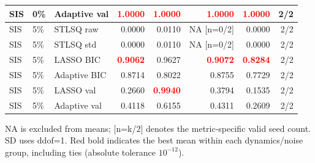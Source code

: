 \documentclass{article}
\begin{document}
\begin{longtable}{lllrrrrr}
SIS & 0\% & Adaptive val & \textcolor{red}{\textbf{1.0000}} & \textcolor{red}{\textbf{1.0000}} & \textcolor{red}{\textbf{1.0000}} & \textcolor{red}{\textbf{1.0000}} & 2/2 \\
\midrule
SIS & 5\% & STLSQ raw & 0.0000 & 0.0110 & NA [n=0/2] & 0.0000 & 2/2 \\
SIS & 5\% & STLSQ std & 0.0000 & 0.0110 & NA [n=0/2] & 0.0000 & 2/2 \\
SIS & 5\% & LASSO BIC & \textcolor{red}{\textbf{0.9062}} & 0.9627 & \textcolor{red}{\textbf{0.9072}} & \textcolor{red}{\textbf{0.8284}} & 2/2 \\
SIS & 5\% & Adaptive BIC & 0.8714 & 0.8022 & 0.8755 & 0.7729 & 2/2 \\
SIS & 5\% & LASSO val & 0.2660 & \textcolor{red}{\textbf{0.9940}} & 0.3794 & 0.1535 & 2/2 \\
SIS & 5\% & Adaptive val & 0.4118 & 0.6155 & 0.4311 & 0.2609 & 2/2 \\
\end{longtable}
\noindent NA is excluded from means; [n=k/2] denotes the metric-specific valid seed count. 
SD uses ddof=1. Red bold indicates the best mean within each dynamics/noise group, including ties (absolute tolerance $10^{-12}$).
\clearpage
\end{document}

